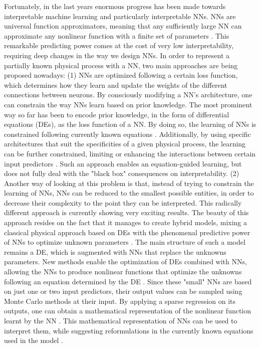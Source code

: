 Fortunately, in the last years enormous progress has been made towards interpretable machine learning and particularly interpretable NNs. NNs are universal function approximators, meaning that any sufficiently large NN can approximate any nonlinear function with a finite set of parameters \citep{winkler_performance_2017}. This remarkable predicting power comes at the cost of very low interpretability, requiring deep changes in the way we design NNs. In order to represent a partially known physical process with a NN, two main approaches are being proposed nowadays: (1) NNs are optimized following a certain loss function, which determines how they learn and update the weights of the different connections between neurons. By consciously modifying a NN's architecture, one can constrain the way NNs learn based on prior knowledge. The most prominent way so far has been to encode prior knowledge, in the form of differential equations (DEs), as the loss function of a NN. By doing so, the learning of NNs is constrained following currently known equations \citep{raissi_physics_2017,karpatne_physics-guided_2018}. Additionally, by using specific architectures that suit the specificities of a given physical process, the learning can be further constrained, limiting or enhancing the interactions between certain input predictors \citep{karpatne_theory-guided_2017}. Such an approach enables an equation-guided learning, but does not fully deal with the "black box" consequences on interpretability. (2) Another way of looking at this problem is that, instead of trying to constrain the learning of NNs, NNs can be reduced to the smallest possible entities, in order to decrease their complexity to the point they can be interpreted. This radically different approach is currently showing very exciting results. The beauty of this approach resides on the fact that it manages to create hybrid models, mixing a classical physical approach based on DEs with the phenomenal predictive power of NNs to optimize unknown parameters \citep{rackauckas_universal_2020}. The main structure of such a model remains a DE, which is augmented with NNs that replace the unknowns parameters. New methods enable the optimization of DEs combined with NNs, allowing the NNs to produce nonlinear functions that optimize the unknowns following an equation determined by the DE \citep{raissi_physics_2017,rackauckas_universal_2020,bradbury_jax_2020}. Since these "small" NNs are based on just one or two input predictors, their output values can be sampled using Monte Carlo methods at their input. By applying a sparse regression on its outputs, one can obtain a mathematical representation of the nonlinear function learnt by the NN \citep{brunton_discovering_2016}. This mathematical representation of NNs can be used to interpret them, while suggesting reformulations in the currently known equations used in the model \citep{rackauckas_universal_2020}. 


